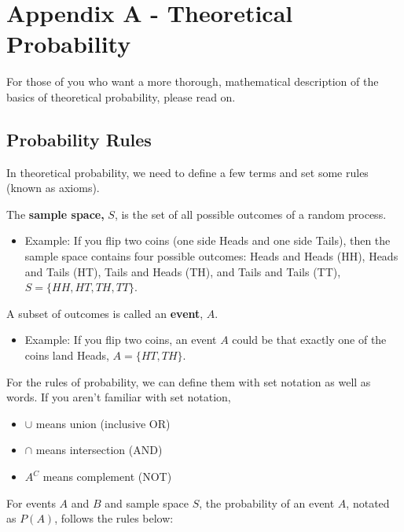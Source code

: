 \documentclass[
]{book}
\providecommand{\tightlist}{%
  \setlength{\itemsep}{0pt}\setlength{\parskip}{0pt}}
\begin{document}
\hypertarget{appendix-a---theoretical-probability}{%
\chapter{Appendix A - Theoretical Probability}\label{appendix-a---theoretical-probability}}

For those of you who want a more thorough, mathematical description of the basics of theoretical probability, please read on.

\hypertarget{probability-rules}{%
\section{Probability Rules}\label{probability-rules}}

In theoretical probability, we need to define a few terms and set some rules (known as axioms).

The \textbf{sample space,} \(S\), is the set of all possible outcomes of a random process.

\begin{itemize}
\tightlist
\item
  Example: If you flip two coins (one side Heads and one side Tails), then the sample space contains four possible outcomes: Heads and Heads (HH), Heads and Tails (HT), Tails and Heads (TH), and Tails and Tails (TT), \(S = \{HH,HT,TH,TT\}\).
\end{itemize}

A subset of outcomes is called an \textbf{event}, \(A\).

\begin{itemize}
\tightlist
\item
  Example: If you flip two coins, an event \(A\) could be that exactly one of the coins land Heads, \(A = \{HT,TH\}\).
\end{itemize}

For the rules of probability, we can define them with set notation as well as words. If you aren't familiar with set notation,

\begin{itemize}
\tightlist
\item
  \(\cup\) means union (inclusive OR)
\item
  \(\cap\) means intersection (AND)
\item
  \(A^C\) means complement (NOT)
\end{itemize}

For events \(A\) and \(B\) and sample space \(S\), the probability of an event \(A\), notated as \(P(A)\), follows the rules below:
\end{document}
